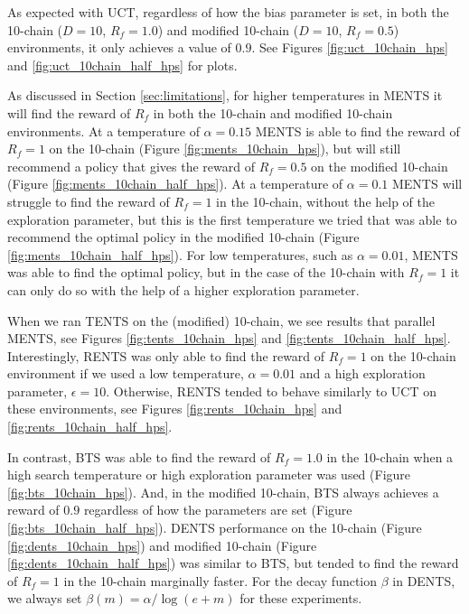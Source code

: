             As expected with UCT, regardless of how the bias parameter is set, in both the 10-chain ($D=10$, $R_f=1.0$) and modified 10-chain ($D=10$, $R_f=0.5$) environments, it only achieves a value of $0.9$. See Figures \ref{fig:uct_10chain_hps} and \ref{fig:uct_10chain_half_hps} for plots.

            As discussed in Section \ref{sec:limitations}, for higher temperatures in MENTS it will find the reward of $R_f$ in both the 10-chain and modified 10-chain environments. At a temperature of $\alpha=0.15$ MENTS is able to find the reward of $R_f=1$ on the 10-chain (Figure \ref{fig:ments_10chain_hps}), but will still recommend a policy that gives the reward of $R_f=0.5$ on the modified 10-chain (Figure \ref{fig:ments_10chain_half_hps}). At a temperature of $\alpha=0.1$ MENTS will struggle to find the reward of $R_f=1$ in the 10-chain, without the help of the exploration parameter, but this is the first temperature we tried that was able to recommend the optimal policy in the modified 10-chain (Figure \ref{fig:ments_10chain_half_hps}). For low temperatures, such as $\alpha=0.01$, MENTS was able to find the optimal policy, but in the case of the 10-chain with $R_f=1$ it can only do so with the help of a higher exploration parameter.

            When we ran TENTS on the (modified) 10-chain, we see results that parallel MENTS, see Figures \ref{fig:tents_10chain_hps} and \ref{fig:tents_10chain_half_hps}. Interestingly, RENTS was only able to find the reward of $R_f=1$ on the 10-chain environment if we used a low temperature, $\alpha=0.01$ and a high exploration parameter, $\epsilon=10$. Otherwise, RENTS tended to behave similarly to UCT on these environments, see Figures \ref{fig:rents_10chain_hps} and \ref{fig:rents_10chain_half_hps}.

            In contrast, BTS was able to find the reward of $R_f=1.0$ in the 10-chain when a high search temperature or high exploration parameter was used (Figure \ref{fig:bts_10chain_hps}). And, in the modified 10-chain, BTS always achieves a reward of $0.9$ regardless of how the parameters are set (Figure \ref{fig:bts_10chain_half_hps}). DENTS performance on the 10-chain (Figure \ref{fig:dents_10chain_hps}) and modified 10-chain (Figure \ref{fig:dents_10chain_half_hps}) was similar to BTS, but tended to find the reward of $R_f=1$ in the 10-chain marginally faster. For the decay function $\beta$ in DENTS, we always set $\beta(m)=\alpha/\log(e+m)$ for these experiments.

